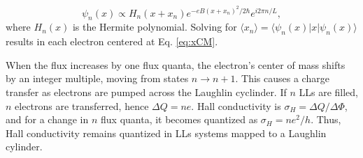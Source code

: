 \begin{equation}
  \psi_n(x) \propto H_n (x+x_n) e^{-eB(x+x_n)^2 / 2\hbar} e^{i2\pi n/L},
\end{equation}
where $H_n(x)$ is the Hermite polynomial.
Solving for $\langle x_n \rangle = \langle \psi_n(x) | x | \psi_n(x) \rangle$ results in each electron centered at Eq. \eqref{eq:xCM}.


When the flux increases by one flux quanta, the electron's center of mass shifts by an integer multiple, moving from states $n \rightarrow n+1$.
This causes a charge transfer as electrons are pumped across the Laughlin cyclinder.
If $n$ LLs are filled, $n$ electrons are transferred, hence $\Delta Q = ne$.
Hall conductivity is $\sigma_H = \Delta Q/ \Delta \Phi$, and for a change in $n$ flux quanta, it becomes quantized as $\sigma_H = ne^2/h$.
Thus, Hall conductivity remains quantized in LLs systems mapped to a Laughlin cylinder.

